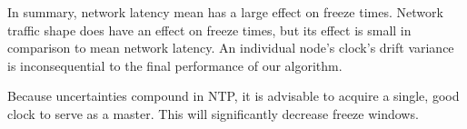
In summary, network latency mean has a large effect on freeze
times. Network traffic shape does have an effect on freeze times, but
its effect is small in comparison to mean network latency. An
individual node's clock's drift variance is inconsequential to the
final performance of our algorithm.

Because uncertainties compound in NTP, it is advisable to acquire a
single, good clock to serve as a master. This will significantly
decrease freeze windows.


